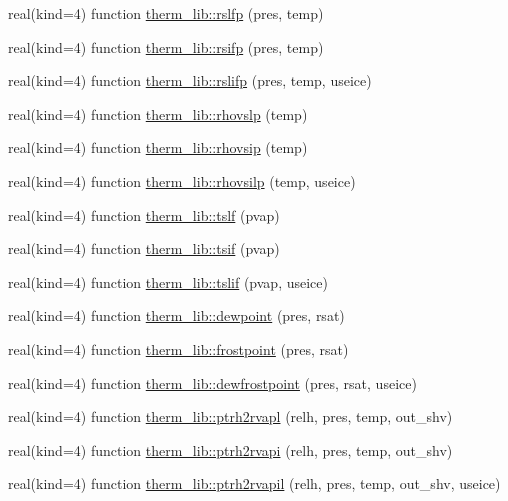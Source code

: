 \begin{DoxyCompactItemize}
\item 
real(kind=4) function \hyperlink{namespacetherm__lib_ae0635cd1cd9e80dafd1cb89243c41e02}{therm\+\_\+lib\+::rslfp} (pres, temp)
\item 
real(kind=4) function \hyperlink{namespacetherm__lib_a55d327a08b380623cd2b036cecdef9f2}{therm\+\_\+lib\+::rsifp} (pres, temp)
\item 
real(kind=4) function \hyperlink{namespacetherm__lib_a3ba8735d59b87e78d614f76ed778b639}{therm\+\_\+lib\+::rslifp} (pres, temp, useice)
\item 
real(kind=4) function \hyperlink{namespacetherm__lib_a47c1103775af2f781f2fabf678217375}{therm\+\_\+lib\+::rhovslp} (temp)
\item 
real(kind=4) function \hyperlink{namespacetherm__lib_a6bc712cfc32b1dcebed47c8a0942b92f}{therm\+\_\+lib\+::rhovsip} (temp)
\item 
real(kind=4) function \hyperlink{namespacetherm__lib_a0d35dbf53cc9ae9c3f1b5a5d21126bd8}{therm\+\_\+lib\+::rhovsilp} (temp, useice)
\item 
real(kind=4) function \hyperlink{namespacetherm__lib_af4ba481a98f65fb3f1e2ff6fb30ace23}{therm\+\_\+lib\+::tslf} (pvap)
\item 
real(kind=4) function \hyperlink{namespacetherm__lib_a45fb7d736264472e118c794a243911fe}{therm\+\_\+lib\+::tsif} (pvap)
\item 
real(kind=4) function \hyperlink{namespacetherm__lib_a7448671da269afe05b39189c581f790b}{therm\+\_\+lib\+::tslif} (pvap, useice)
\item 
real(kind=4) function \hyperlink{namespacetherm__lib_a4a7268a45c9e0384a7711ec8b1d2b24e}{therm\+\_\+lib\+::dewpoint} (pres, rsat)
\item 
real(kind=4) function \hyperlink{namespacetherm__lib_aa7fff31ade0f9d6070e4bc986e0f5e24}{therm\+\_\+lib\+::frostpoint} (pres, rsat)
\item 
real(kind=4) function \hyperlink{namespacetherm__lib_a0611d2fb3b39f0af58f3417bd88c43f0}{therm\+\_\+lib\+::dewfrostpoint} (pres, rsat, useice)
\item 
real(kind=4) function \hyperlink{namespacetherm__lib_a31b5123d35b5fab2d91701e148b5ac1d}{therm\+\_\+lib\+::ptrh2rvapl} (relh, pres, temp, out\+\_\+shv)
\item 
real(kind=4) function \hyperlink{namespacetherm__lib_ac6a566c85228fe3eb44352086e7b22e2}{therm\+\_\+lib\+::ptrh2rvapi} (relh, pres, temp, out\+\_\+shv)
\item 
real(kind=4) function \hyperlink{namespacetherm__lib_a0b228d623c4a7506f51e5ffb0af0652f}{therm\+\_\+lib\+::ptrh2rvapil} (relh, pres, temp, out\+\_\+shv, useice)

\end{DoxyCompactItemize}
